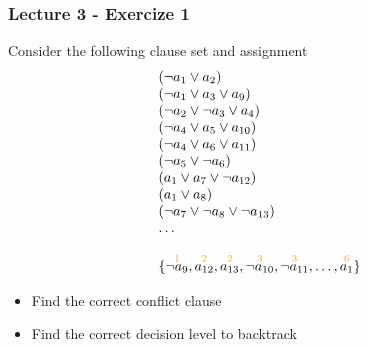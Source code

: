 \begin{frame}
  \frametitle{Lecture 3 - Exercize 1}

  \scriptsize

  Consider the following clause set and assignment
  $$
  \begin{array}{l}
  (\neg a_1 \vee a_2) \\
  (\neg a_1 \vee a_3 \vee a_9) \\
  (\neg a_2 \vee \neg a_3 \vee a_4) \\
  (\neg a_4 \vee a_5 \vee a_{10}) \\
  (\neg a_4 \vee a_6 \vee a_{11}) \\
  (\neg a_5 \vee \neg a_6) \\
  (a_1 \vee a_7 \vee \neg a_{12}) \\
  (a_1 \vee a_8) \\
  (\neg a_7 \vee \neg a_8 \vee \neg a_{13}) \\
  \ldots \\ \\
  \{ \dec{\neg a_9}{1}, \dec{a_{12}}{2}, \dec{a_{13}}{2}, \dec{\neg a_{10}}{3}, \dec{\neg a_{11}}{3}, \ldots, \dec{a_1}{6}\}
  \end{array}
  $$
  \vfill
  \begin{itemize}
    \item Find the correct conflict clause
    \item Find the correct decision level to backtrack
  \end{itemize}

\end{frame}

